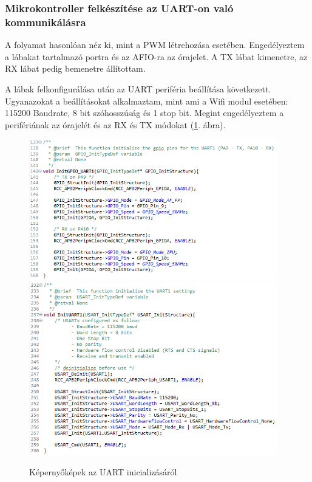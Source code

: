 \documentclass[../main.tex]{subfiles}
\begin{document}
        \subsubsection{Mikrokontroller felkészítése az UART-on való kommunikálásra}
            A folyamat hasonlóan néz ki, mint a PWM létrehozása esetében. Engedélyeztem a lábakat tartalmazó portra és az AFIO-ra az órajelet. A TX lábat kimenetre, az RX lábat pedig bemenetre állítottam.
            
            A lábak felkonfigurálása után az UART periféria beállítása következett. Ugyanazokat a beállításokat alkalmaztam, mint ami a Wifi modul esetében: 115200 Baudrate, 8 bit szóhosszúság és 1 stop bit. Megint engedélyeztem a perifériának az órajelét és az RX és TX módokat (\ref{fig:uart_init}. ábra).  
            \begin{figure}[h!]
                \centering
                    \includegraphics[width=10.8cm]{mbed_res/uart_init_gpio}
                    \includegraphics[width=10.8cm]{mbed_res/uart_init}
                \caption{Képernyőképek az UART inicializásáról}
                \label{fig:uart_init}
            \end{figure}
            
\end{document}
